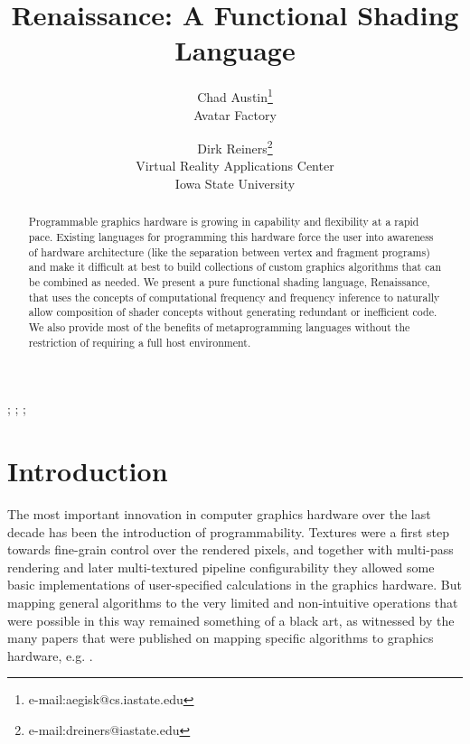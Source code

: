 \documentclass[review]{acmsiggraph}      %
\title{Renaissance: A Functional Shading Language}
\author{Chad Austin\thanks{e-mail:aegisk@cs.iastate.edu}\\ Avatar Factory %
\and Dirk Reiners\thanks{e-mail:dreiners@iastate.edu}\\ Virtual Reality Applications Center\\Iowa State University}
\begin{document}
\maketitle

\begin{abstract}

Programmable graphics hardware is growing in capability and flexibility at a
rapid pace.  Existing languages for programming this hardware force the user
into awareness of hardware architecture (like the separation between vertex
and fragment programs) and make it difficult at best to build collections of
custom graphics algorithms that can be combined as needed.  We present a
pure functional shading language, Renaissance, that uses the concepts of
computational frequency and frequency inference to naturally allow
composition of shader concepts without generating redundant or inefficient
code.  We also provide most of the benefits of metaprogramming languages
without the restriction of requiring a full host environment.

\end{abstract}


\begin{CRcatlist}
 ;
 ;
 ;
\end{CRcatlist}

\keywordlist

\section{Introduction}

\copyrightspace

The most important innovation in computer graphics hardware over the last 
decade has been the introduction of programmability. Textures were a first
step  towards fine-grain control over the rendered pixels, and together with
multi-pass  rendering and later multi-textured pipeline configurability they
allowed some  basic implementations of user-specified calculations in the
graphics hardware. But mapping general algorithms to the very limited
and non-intuitive  operations that were possible in this way remained
something of a black art, as  witnessed by the many papers that were
published on mapping specific algorithms to graphics hardware, e.g. 
\cite{heidrich01Shading,kautztowards}. 
\end{document}
